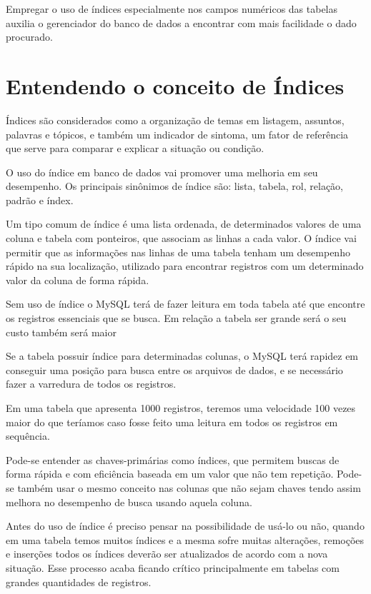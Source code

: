 \documentclass[12pt,a4paper]{article}
\begin{document}
Empregar o uso de índices especialmente nos campos numéricos das tabelas auxilia o gerenciador do banco de dados a encontrar com mais facilidade o dado procurado.

\section{Entendendo o conceito de Índices}

Índices são considerados como a organização de temas em listagem, assuntos, palavras e tópicos, e também um indicador de sintoma, um fator de referência que serve para comparar e explicar a situação ou condição.

O uso do índice em banco de dados vai promover uma melhoria em seu desempenho. Os principais sinônimos de índice são: lista, tabela, rol, relação, padrão e índex.

Um tipo comum de índice é uma lista ordenada, de determinados valores de uma coluna e tabela com ponteiros, que associam as linhas a cada valor. O índice vai permitir que as informações nas linhas de uma tabela tenham um desempenho rápido na sua localização, utilizado para encontrar registros com um determinado valor da coluna de forma rápida.

Sem uso de índice o MySQL terá de fazer leitura em toda tabela até que encontre os registros essenciais que se busca. Em relação a tabela ser grande será o seu custo também será maior

Se a tabela possuir índice para determinadas colunas, o MySQL terá rapidez em conseguir uma posição para busca entre os arquivos de dados, e se necessário fazer a varredura de todos os registros.

Em uma tabela que apresenta 1000 registros, teremos uma velocidade 100 vezes maior do que teríamos caso fosse feito uma leitura em todos os registros em sequência.

Pode-se entender as chaves-primárias como índices, que permitem buscas de forma rápida e com eficiência baseada em um valor que não tem repetição. Pode-se também usar o mesmo conceito nas colunas que não sejam chaves tendo assim melhora no desempenho de busca usando aquela coluna.

Antes do uso de índice é preciso pensar na possibilidade de usá-lo ou não, quando em uma tabela temos muitos índices e a mesma sofre muitas alterações, remoções e inserções todos os índices deverão ser atualizados de acordo com a nova situação. Esse processo acaba ficando crítico principalmente em tabelas com grandes quantidades de registros.
\end{document}

